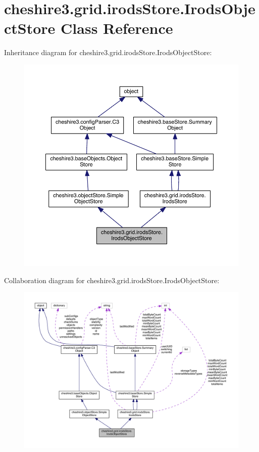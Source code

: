 \hypertarget{classcheshire3_1_1grid_1_1irods_store_1_1_irods_object_store}{\section{cheshire3.\-grid.\-irods\-Store.\-Irods\-Object\-Store Class Reference}
\label{classcheshire3_1_1grid_1_1irods_store_1_1_irods_object_store}
}


Inheritance diagram for cheshire3.\-grid.\-irods\-Store.\-Irods\-Object\-Store\-:
\nopagebreak
\begin{figure}[H]
\begin{center}
\leavevmode
\includegraphics[width=350pt]{classcheshire3_1_1grid_1_1irods_store_1_1_irods_object_store__inherit__graph}
\end{center}
\end{figure}


Collaboration diagram for cheshire3.\-grid.\-irods\-Store.\-Irods\-Object\-Store\-:
\nopagebreak
\begin{figure}[H]
\begin{center}
\leavevmode
\includegraphics[width=350pt]{classcheshire3_1_1grid_1_1irods_store_1_1_irods_object_store__coll__graph}
\end{center}
\end{figure}
